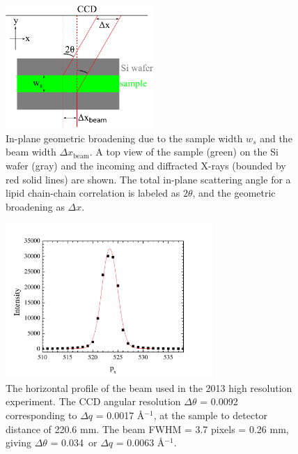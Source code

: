 \begin{figure}[htbp]
  \centering
  \includegraphics[width=0.5\textwidth]{figures/ripple/MMs/waxs/geometric_broadening}
  \caption{In-plane geometric broadening due to the sample width $w_s$ and the beam width $\Delta x_\textrm{beam}$.
  A top view of the sample (green) on the Si wafer (gray) and the
  incoming and diffracted X-rays (bounded by red solid lines)
  are shown. The total in-plane scattering
  angle for a lipid chain-chain correlation is labeled as $2\theta$, and 
  the geometric broadening as $\Delta x$.}
  \label{fig:geometric_broadening}
\end{figure}

\begin{figure}[htbp]
  \centering
  \includegraphics[width=0.7\textwidth]{figures/ripple/MMs/waxs/beamx_hr}
  \caption{The horizontal profile of the beam used in the 2013 high resolution 
  experiment. The CCD angular resolution $\Delta\theta$ = 0.0092\textdegree\,
  corresponding to $\Delta q$ = 0.0017 \AA$^{-1}$, at the sample to detector
  distance of 220.6 mm. The beam FWHM = 3.7 pixels = 0.26 mm, giving
  $\Delta\theta$ = 0.034\textdegree\ or $\Delta q$ = 0.0063 \AA$^{-1}$. }
  \label{fig:NGIWAXS_beamx}
\end{figure} 

